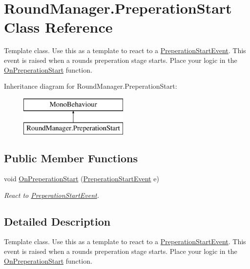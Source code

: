 \hypertarget{class_round_manager_1_1_preperation_start}{}\section{Round\+Manager.\+Preperation\+Start Class Reference}
\label{class_round_manager_1_1_preperation_start}


Template class. Use this as a template to react to a \hyperlink{class_round_manager_1_1_events_1_1_preperation_start_event}{Preperation\+Start\+Event}. This event is raised when a rounds preperation stage starts. Place your logic in the \hyperlink{class_round_manager_1_1_preperation_start_a797df8dcc24c26b43bbe77bd36f3b109}{On\+Preperation\+Start} function.  


Inheritance diagram for Round\+Manager.\+Preperation\+Start\+:\begin{figure}[H]
\begin{center}
\leavevmode
\includegraphics[height=2.000000cm]{class_round_manager_1_1_preperation_start}
\end{center}
\end{figure}
\subsection*{Public Member Functions}
\begin{DoxyCompactItemize}
\item 
void \hyperlink{class_round_manager_1_1_preperation_start_a797df8dcc24c26b43bbe77bd36f3b109}{On\+Preperation\+Start} (\hyperlink{class_round_manager_1_1_events_1_1_preperation_start_event}{Preperation\+Start\+Event} e)
\begin{DoxyCompactList}\small\item\em React to \hyperlink{class_round_manager_1_1_events_1_1_preperation_start_event}{Preperation\+Start\+Event}. \end{DoxyCompactList}\end{DoxyCompactItemize}


\subsection{Detailed Description}
Template class. Use this as a template to react to a \hyperlink{class_round_manager_1_1_events_1_1_preperation_start_event}{Preperation\+Start\+Event}. This event is raised when a rounds preperation stage starts. Place your logic in the \hyperlink{class_round_manager_1_1_preperation_start_a797df8dcc24c26b43bbe77bd36f3b109}{On\+Preperation\+Start} function. 



